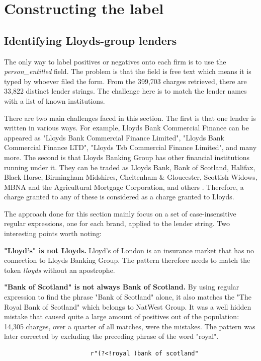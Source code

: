 \documentclass[ %
                    author={Natchalin Iwsakul \\[0.4em] Inkaphol Siriwongwattana \\[0.4em] Tanaphan Kummaraphat \\[0.6em] Patorn Srisupap},,
                supervisor={Fernando Moreno-Pino},
                    degree={MSc},
                     title={Propensity Modelling for SME Commercial Lending Using Open Public Data
},
                  subtitle={Companies House and GDELT as predictors of first-time borrowing},
                      type={},
                      year={2026}]{dissertation}
\begin{document}
\section{Constructing the label}               \label{sec:label}
  \subsection{Identifying Lloyds-group lenders}
  The only way to label positives or negatives onto each firm is to use the \textit{person\_entitled} field. The problem is that the field is free text which means it is typed by whoever filed the form. From the 399,703 charges retrieved, there are 33,822 distinct lender strings. The challenge here is to match the lender names with a list of known institutions.

  There are two main challenges faced in this section. The first is that one lender is written in various ways. For example, Lloyds Bank Commercial Finance can be appeared as "Lloyds Bank Commercial Finance Limited", "Lloyds Bank Commercial Finance LTD", "Lloyds Tsb Commercial Finance Limited", and many more. The second is that Lloyds Banking Group has other financial institutions running under it. They can be traded as Lloyds Bank, Bank of Scotland, Halifax, Black Horse, Birmingham Midshires, Cheltenham \& Gloucester, Scottish Widows, MBNA and the Agricultural Mortgage Corporation, and others \citep{lbg_annual_report}. Therefore, a charge granted to any of these is considered as a charge granted to Lloyds.

  The approach done for this section mainly focus on a set of case-insensitive regular expressions, one for each brand, applied to the lender string. Two interesting points worth noting:

  \textbf{"Lloyd's" is not Lloyds.} Lloyd's of London is an insurance market that has no connection to Lloyds Banking Group. The pattern therefore needs to match the token \textit{lloyds} without an apostrophe.

  \textbf{"Bank of Scotland" is not always Bank of Scotland.} By using regular expression to find the phrase "Bank of Scotland" alone, it also matches the "The Royal Bank of Scotland" which belongs to NatWest Group. It was a well hidden mistake that caused quite a large amount of positives out of the population: 14,305 charges, over a quarter of all matches, were the mistakes. The pattern was later corrected by excluding the preceding phrase of the word "royal".
  
                        \begin{lstlisting}
                        r"(?<!royal )bank of scotland"
                        \end{lstlisting}
\end{document}
